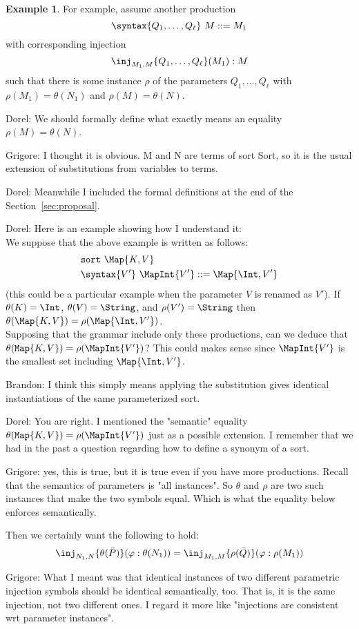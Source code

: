 \documentclass{article}
\newcommand\comment[2]{\par\noindent\color{red}#1: #2\color{black}\par\noindent}
\newcommand\dl{\comment{Dorel}}
\newcommand\gr{\comment{Grigore}}
\theoremstyle{definition}
\newtheorem{example}{Example}[section]
\theoremstyle{definition}
\theoremstyle{definition}
\theoremstyle{definition}
\theoremstyle{theorem}
\theoremstyle{theorem}
\theoremstyle{theorem}
\theoremstyle{theorem}
\theoremstyle{theorem}
\newcommand{\sort}{\texttt{sort}}
\begin{document}
\begin{example}\label{consistency-parallel}
For example, assume another production
\[\syntax\{Q_1,\ldots,Q_\ell\}\ M::=M_1\]
with corresponding injection
\[\inj_{M_1,M}\{Q_1,\ldots,Q_\ell\}(M_1):M\]
such that there is some instance \(\rho\) of the parameters
\(Q_1,\ldots,Q_\ell\) with \(\rho(M_1) = \theta(N_1)\) and
\(\rho(M) = \theta(N)\).
\dl{We should formally define what exactly means an equality $\rho(M)=\theta(N)$. }
\gr{I thought it is obvious.  M and N are terms of sort Sort, so it is the usual extension of substitutions from variables to terms.}
\dl{Meanwhile I included the formal definitions at the end of the Section~\ref{sec:proposal}.}
\dl{Here is an example showing how I understand it:
\\
We suppose that the above example is written as follows:
\begin{align*}
&\sort\ \Map{K,V}\\
&\syntax\{V'\}\ \MapInt{V'} ::= \Map{\Int, V'}
\end{align*}
(this could be a particular example when the parameter $V$ is renamed as $V'$).
If \(\theta(K)=\Int\), \(\theta(V)=\String\),
and \(\rho(V')=\String\) then \(\theta(\Map{K,V})=\rho(\Map{\Int,V'})\).
\\
Supposing that the grammar include only these productions, can we deduce that
\(\theta({\tt Map}\{K,V\})=\rho(\MapInt{V'})\)?
This could makes sense since \(\MapInt{V'}\) is the smallest set including \(\Map{\Int,V'}\).
}
\comment{Brandon}{
I think this simply means applying the substitution gives identical instantiations
of the same parameterized sort.
}
\dl{You are right. I mentioned the "semantic" equality \(\theta({\tt Map}\{K,V\})=\rho(\MapInt{V'})\) just as a possible extension. I remember that we had in the past a question regarding how to define a synonym of a sort.}
\gr{yes, this is true, but it is true even if you have more productions.  Recall that the semantics of parameters is "all instances".  So $\theta$ and $\rho$ are two such instances that make the two symbols equal.  Which is what the equality below enforces semantically.}
Then we certainly want the following to hold:
\[\inj_{N_1,N}\{\theta(\bar{P})\}(\varphi:\theta(N_1))
 = \inj_{M_1,M}\{\rho(\bar{Q})\}(\varphi:\rho(M_1))\]
\end{example}
\gr{What I meant was that identical instances of two different parametric injection symbols should be identical semantically, too.  That is, it is the same injection, not two different ones.  I regard it more like "injections are consistent wrt parameter instances".}
\end{document}
